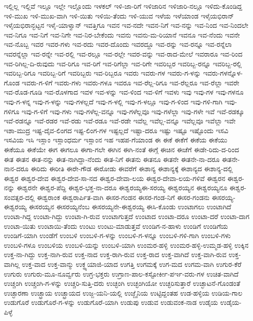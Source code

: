 ಇಲ್ಲಿಲ್ಲ
ಇಲ್ಲಿವೆ
ಇಲ್ಲೂ
ಇಲ್ಲೇ
ಇಲ್ಲೊಂದು
ಇಳಕಲ್
ಇಳಿ-ಜಾ-ರಿಗೆ
ಇಳಿಜಾರಿನ
ಇಳಿಜಾರಿ-ನಲ್ಲೂ
ಇಳಿದು-ಕೊಂಡಿದ್ದ
ಇಳಿ-ಮುಖ
ಇಳಿ-ಮುಖ-ವಾಗಿ
ಇಳಿ-ಯಿತು
ಇಳಿಯಿ-ತೆಂದು
ಇಳಿ-ಯುವ
ಇಳೆಯ
ಇಳೆಯಾಂಡ
ಇಳೈಯಭಿರಾನ್
ಇಳೈಯಭಿರಾನ್ಭಟ್ಟನ
ಇಳೈ-ಯಾಳ್ವಾನ್
ಇವತ್ತಿಗೂ
ಇವನ
ಇವ-ನದೇ
ಇವನ-ನಿಗೆ
ಇವ-ನನ್ನು
ಇವ-ನಿಂದ
ಇವ-ನಿಂದಲೇ
ಇವ-ನಿಗೂ
ಇವ-ನಿಗೆ
ಇವ-ನಿಗೇ
ಇವ-ನಿರ-ಬೇಕೆಂದು
ಇವನು
ಇವನು-ಮ-ರಿಯಾನೆ
ಇವನೂ
ಇವ-ನೆಂದು
ಇವನೇ
ಇವ-ನೊಬ್ಬ
ಇವರ
ಇವರ-ಗಳು
ಇವ-ರದು
ಇವರ-ದೊಂದು
ಇವರದ್ದೂ
ಇವ-ರನ್ನು
ಇವ-ರನ್ನೂ
ಇವ-ರನ್ನೆಲಾ
ಇವರನ್ನೆಲ್ಲಾ
ಇವ-ರನ್ನೇ
ಇವ-ರಲ್ಲಿ
ಇವ-ರಲ್ಲೂ
ಇವ-ರಲ್ಲೇ
ಇವರ-ವನ್ನು
ಇವ-ರಾದ-ಮೇಲೆ
ಇವರಾರೂ
ಇವ-ರಿಂದ
ಇವ-ರಿಗಿಲ್ಲ-ದಿ-ರುವುದು
ಇವ-ರಿಗೂ
ಇವ-ರಿಗೆ
ಇವ-ರಿಗೆಲ್ಲಾ
ಇವ-ರಿಗೇ
ಇವರಿಬ್ಬರ
ಇವರಿಬ್ಬ-ರನ್ನೂ
ಇವರಿಬ್ಬ-ರಲ್ಲಿ
ಇವರಿಬ್ಬ-ರಿಗೂ
ಇವರಿಬ್ಬ-ರಿಗೆ
ಇವರಿಬ್ಬರು
ಇವ-ರಿಬ್ಬರೂ
ಇವರು
ಇವರು-ಗಳ
ಇವರು-ಗ-ಳನ್ನು
ಇವರು-ಗಳನ್ನೊಳ-ಗೊಂಡ
ಇವರು-ಗ-ಳಿಗೆ
ಇವರು-ಗಳು
ಇವರು-ಗಳೂ
ಇವರೂ
ಇವ-ರೆಲ್ಲ-ರಿಗೂ
ಇವ-ರೆಲ್ಲರೂ
ಇವ-ರೆಲ್ಲಾ
ಇವರೇ
ಇವ-ರೊಡ-ಗೂಡಿ
ಇವ-ರೊಳಗಾದ
ಇವಳ
ಇವ-ಳನ್ನು
ಇವ-ಳಿಂದ
ಇವ-ಳಿಗೆ
ಇವಳು
ಇವು
ಇವು-ಗಳ
ಇವು-ಗಳನೂ
ಇವು-ಗ-ಳನ್ನ
ಇವು-ಗ-ಳನ್ನು
ಇವು-ಗಳಲ್ಲದೆ
ಇವು-ಗ-ಳಲ್ಲಿ
ಇವು-ಗ-ಳಲ್ಲೂ
ಇವು-ಗ-ಳಿಂದ
ಇವು-ಗಳಿ-ಗಾಗಿ
ಇವು-ಗಳಿಗೂ
ಇವು-ಗ-ಳಿಗೆ
ಇವು-ಗಳು
ಇವು-ಗಳೆಲ್ಲ-ವನ್ನೂ
ಇವು-ಗಳೆಲ್ಲವೂ
ಇವು-ಗಳೆಲ್ಲಾ
ಇವು-ಗಳೇ
ಇವೆ
ಇವೆ-ರಡಕ್ಕೂ
ಇವೆ-ರಡನ್ನೂ
ಇವೆ-ರಡರ
ಇವೆ-ರಡು
ಇವೆ-ರಡೂ
ಇವೆ-ರಡೇ
ಇವೆಲ್ಲ
ಇವೆಲ್ಲ-ವನ್ನೂ
ಇವೆಲ್ಲವೂ
ಇವೆಲ್ಲಾ
ಇವೇ
ಇಶಾ-ಮುದ್ರ
ಇಷ್ಟ-ದೈವ-ಲಿಂಗದ
ಇಷ್ಟ-ಲಿಂಗ-ಗಳ
ಇಷ್ಟಲ್ಲದೆ
ಇಷ್ಟಾ-ದರೂ
ಇಷ್ಟು
ಇಷ್ಟೂ
ಇಷ್ಟೊಂದು
ಇಸವಿ
ಇಸವಿಯ
ಇಸಿ
ಇಸ್ಲಾಂ
ಇಸ್ಲಾಂಧರ್ಮ
ಇಸ್ಲಾಂನ
ಇಹ
ಇಹಪ-ಗೆಯಾಂಡ
ಈ
ಈಕೆ
ಈಕೆಗೆ
ಈಕೆಯ
ಈಕೆಯು
ಈಕೆಯೂ
ಈಕೆಯೇ
ಈಗ
ಈಗಲೂ
ಈಗಾ-ಗಲೇ
ಈಗಿನ
ಈಗಿ-ನಂತೆ
ಈಗ್ಗೆ
ಈಚಿನ
ಈಚೆಗೆ
ಈಡೇ-ರಿದು-ದ-ರಿಂದ
ಈತ
ಈತನ
ಈತ-ನನ್ನು
ಈತ-ನಾಗಿದ್ದಾ-ನೆಂದು
ಈತ-ನಿಗೆ
ಈತನು
ಈತನೂ
ಈತನೇ
ಈತನೇ-ನಾ-ದರೂ
ಈತನೇ-ನಾನ-ದರೂ
ಈರಿದು
ಈರೀತಿ
ಈರೇ-ಗೌಡ
ಈರೋಡು
ಈವರೆಗೆ
ಈಶಾನ್ಯ
ಈಶಾನ್ಯಕ್ಕೆ
ಈಶಾನ್ಯದ
ಈಶಾನ್ಯ-ದಲ್ಲಿ
ಈಶ್ವರ
ಈಶ್ವರ-ದೇವ
ಈಶ್ವರ-ದೇವ-ಸಾ-ನದ
ಈಶ್ವರ-ದೇವಾ-ಲಯ
ಈಶ್ವರ-ದೇವಾ-ಲಯ-ಗಳಿವೆ
ಈಶ್ವರನ
ಈಶ್ವರ-ನನ್ನು
ಈಶ್ವರನೇ
ಈಶ್ವರ-ಪೆದ್ದಿ
ಈಶ್ವರ-ಭಕ್ತ-ನಾ-ದರೂ
ಈಶ್ವರಯ್ಯಈ-ಸರಯ್ಯ
ಈಶ್ವರಯ್ಯನ
ಈಶ್ವರಯ್ಯನೂ
ಈಶ್ವರ-ಸಂವತ್ಸರ-ದಲ್ಲಿ
ಈಶ್ವರಾಂಕ
ಈಶ್ವರಾರ್ಪಿತ-ವಾಗಿ
ಈಸರ-ಗಂಡನ
ಈಸರ-ಗಂಡ-ನಿಗೆ
ಈಸರ-ಗಂಡನು
ಈಸರಯ್ಯ-ಈಶ್ವರಯ್ಯ
ಈಸರಯ್ಯನ
ಈಸರಯ್ಯನೆಂಬ
ಈಸರಯ್ಯನೇ-ಈಶ್ವರಯ್ಯ
ಈಸಿ-ಕೊಂಡು
ಉಂಟಾಗಲು
ಉಂಟಾಗಿದೆ
ಉಂಟಾ-ಗಿದ್ದ
ಉಂಟಾ-ಗಿದ್ದು
ಉಂಟಾ-ಗಿ-ರುವ
ಉಂಟಾಗುತ್ತದೆ
ಉಂಟಾದ
ಉಂಟಾ-ದರೂ
ಉಂಟಾ-ದರೆ
ಉಂಟಾ-ದಾಗ
ಉಂಟಾ-ಯಿತು
ಉಂಟಾಯಿ-ತೆಂದು
ಉಂಟು
ಉಂಟು-ಮಾಡುತ್ತವೆ
ಉಂಡಿಗ-ನ-ಹಾಳು
ಉಂಡಿಗೆ
ಉಂಡಿಗೆಯ
ಉಂಡಿಗೆ-ಯಾಗಿ
ಉಂಡೆಗೆ
ಉಂಬಳಿ
ಉಂಬಳಿ-ಗ-ಳನ್ನು
ಉಂಬಳಿ-ಗ-ಳನ್ನೂ
ಉಂಬಳಿ-ಗಳಿ-ಗಾಗಿ
ಉಂಬಳಿ-ಗಳು
ಉಂಬಳಿ-ಗಳೂ
ಉಂಬಳಿಯ
ಉಂಬಳಿ-ಯನ್ನು
ಉಂಬಳಿ-ಯಾಗಿ
ಉಂಮರ-ಹಳ್ಳಿ
ಉಂಮರ-ಹಳ್ಳಿ-ಉಮ್ಮಡ-ಹಳ್ಳಿ
ಉಕ್ಕಿನ
ಉಕ್ತ-ನಾ-ಗಿದ್ದು
ಉಕ್ತ-ನಾಗಿ-ರುವ
ಉಕ್ತ-ನಾದ
ಉಕ್ತ-ರಾಗಿ-ರುವ
ಉಕ್ತ-ರಾದ
ಉಕ್ತ-ವಾಗಿದೆ
ಉಕ್ತ-ವಾಗಿ-ರುವ
ಉಕ್ತ-ವಾಗಿಲ್ಲ
ಉಕ್ತ-ವಾದ
ಉಕ್ತ-ವಾನ್ಮು
ಉಕ್ಥ್ಯಯಾಜಿ-ಯಾದ
ಉಗತ್ತಿ
ಉಗಮಕ್ಕೆ
ಉಗ-ಮದ
ಉಗಮ-ವಾಗಿ
ಉಗುರ-ಕೆರೆ
ಉಗುರು
ಉಗುರು-ಮೂ-ನೂರ್ವ್ವರು
ಉಗ್ರ-ಭಕ್ತರು
ಉಗ್ರಾಣ-ಪಾಲ-ಕಸ್ಟೋರ್ಕೀ-ಪರ್ಇ-ವರು-ಗಳ
ಉಚಿತ-ವಾಗಿದೆ
ಉಚ್ಚಂಗಿ
ಉಚ್ಚಂಗಿ-ಗ-ಳನ್ನು
ಉಚ್ಚರಿ-ಸುತ್ತಿ-ದರು
ಉಚ್ಛಂಗಿ
ಉಚ್ಛಂಗಿಯೋ
ಉಚ್ಛರಿಸುತ್ತಾರೆ
ಉಚ್ಛಾಟನೆ-ಗೊಂಡಂತೆ
ಉಚ್ಛಾರಣಾ
ಉಚ್ಛ್ರಾಯ
ಉಚ್ಛ್ರಾಯದ
ಉಜ್ಜ-ಯನಿ-ಯಲ್ಲಿ
ಉಜ್ಜೈನಿಯ
ಉಟ್ಟಿದ್ದಂತಹ
ಉಡ-ಹಳ್ಳಿಯ
ಉಡಿಯ-ಗಾಲ
ಉಡುಗೊರೆ
ಉಡುಗೊರೆ-ಗ-ಳನ್ನು
ಉಡುಗೊರೆ-ಯಾಗಿ
ಉಡುಪು
ಉಡುವ
ಉಡುವಂಕ-ನಾಡ
ಉಡೈಯ
ಉಡೈಯ-ಪಿಳ್ಳೆ
